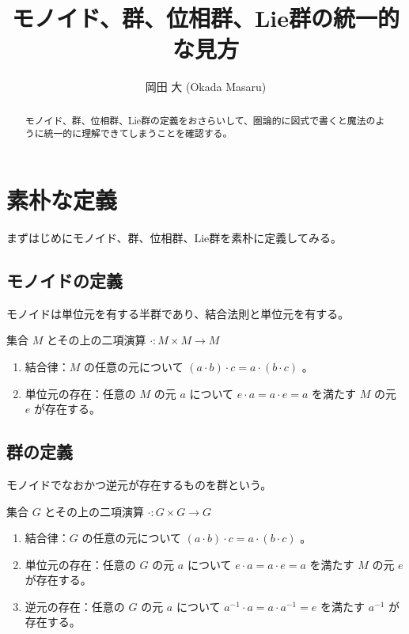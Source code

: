\documentclass[uplatex,a4j,12pt,dvipdfmx]{jsarticle}
\title{
モノイド、群、位相群、Lie群の統一的な見方
}
\author{
岡田 大 (Okada Masaru)
}
\begin{document}
\maketitle


\begin{abstract}
	モノイド、群、位相群、Lie群の定義をおさらいして、圏論的に図式で書くと魔法のように統一的に理解できてしまうことを確認する。
\end{abstract}

\section{素朴な定義}

まずはじめにモノイド、群、位相群、Lie群を素朴に定義してみる。

\subsection{モノイドの定義}

モノイドは単位元を有する半群であり、結合法則と単位元を有する。

集合 $M$ とその上の二項演算 $\cdot : M \times M \to M$

\begin{enumerate}
	\item 結合律：$M$ の任意の元について $(a \cdot b) \cdot c = a \cdot (b \cdot c)$ 。
	\item 単位元の存在：任意の $M$ の元 $a$ について $e \cdot a = a \cdot e = a$ を満たす $M$ の元 $e$ が存在する。
\end{enumerate}

\subsection{群の定義}

モノイドでなおかつ逆元が存在するものを群という。

集合 $G$ とその上の二項演算 $\cdot : G \times G \to G$

\begin{enumerate}
	\item 結合律：$G$ の任意の元について $(a \cdot b) \cdot c = a \cdot (b \cdot c)$ 。
	\item 単位元の存在：任意の $G$ の元 $a$ について $e \cdot a = a \cdot e = a$ を満たす $M$ の元 $e$ が存在する。
	\item 逆元の存在：任意の $G$ の元 $a$ について $a^{-1} \cdot a = a \cdot a^{-1} = e$ を満たす $a^{-1}$ が存在する。
\end{enumerate}
\end{document}
